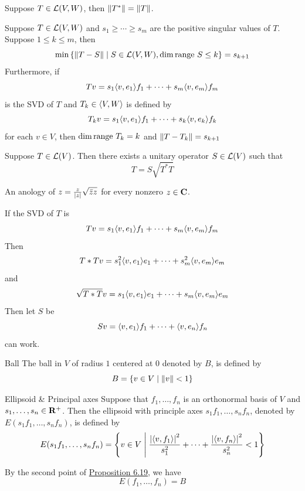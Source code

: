 \documentclass[12pt,a4paper]{article}
\begin{document}
    \begin{prop}
        Suppose $T\in\mathcal{L}(V,W)$, then $\left\lVert T^*\right\rVert=\left\lVert T\right\rVert$.
    \end{prop}
    \hfill

    \begin{prop}
        Suppose $T\in\mathcal{L}(V,W)$ and $s_1\geq\cdots\geq s_m$ are the positive singular values of $T$. Suppose $1\leq k\leq m$, then
        $$
        \min\left\{\left\lVert T-S\right\rVert\mid S\in\mathcal{L}(V,W),\dim\operatorname{range\,} S\leq k\right\}=s_{k+1}
        $$
        Furthermore, if
        $$
        Tv=s_1\langle v,e_1\rangle f_1+\cdots+s_m\langle v,e_m\rangle f_m 
        $$
        is the SVD of $T$ and $T_k\in\langle V,W\rangle$ is defined by
        $$
        T_kv=s_1\langle v,e_1\rangle f_1+\cdots+s_k\langle v,e_k\rangle f_k
        $$
        for each $v\in V$, then $\dim\operatorname{range\,} T_k=k$ and $\left\lVert T-T_k\right\rVert=s_{k+1}$
    \end{prop}
    \hfill

    \begin{prop}
        Suppose $T\in\mathcal{L}(V)$. Then there exists a unitary operator $S\in\mathcal{L}(V)$ such that
        $$
        T=S\sqrt{T^*T}
        $$
    \end{prop}
    \begin{remark}
        An anology of $z=\frac{z}{\left\lvert z\right\rvert}\sqrt{\Bar{z}z}$ for every nonzero $z\in\mathbf{C}$.
    \end{remark}
    \begin{remark}
        If the SVD of $T$ is
        $$
        Tv=s_1\langle v,e_1\rangle f_1+\cdots+s_m\langle v,e_m\rangle f_m
        $$
        Then
        $$
        T*Tv=s_1^2\langle v,e_1\rangle e_1+\cdots+s_m^2\langle v,e_m\rangle e_m
        $$
        and
        $$
        \sqrt{T*T}v=s_1\langle v,e_1\rangle e_1+\cdots+s_m\langle v,e_m\rangle e_m
        $$
        Then let $S$ be
        $$
        Sv=\langle v,e_1\rangle f_1+\cdots+\langle v,e_n\rangle f_n
        $$
        can work.
    \end{remark}
    \hfill

    \begin{defi}{Ball}
        The ball in $V$ of radius $1$ centered at $0$ denoted by $B$, is defined by
        $$
        B=\left\{v\in V\mid \left\lVert v\right\rVert<1\right\}
        $$
    \end{defi}
    \begin{defi}{Ellipsoid \& Principal axes}
        Suppose that $f_1,\dots,f_n$ is an orthonormal basis of $V$ and $s_1,\dots,s_n\in\mathbf{R}^+$. Then the ellipsoid with principle axes $s_1f_1,\dots,s_nf_n$, denoted by $E(s_1f_1,\dots,s_nf_n)$, is defined by
        $$
        E(s_1f_1,\dots,s_nf_n)=\left\{v\in V\;\middle|\;\frac{\left\lvert \langle v,f_1\rangle\right\rvert^2}{s_1^2}+\cdots+\frac{\left\lvert \langle v,f_n\rangle\right\rvert^2}{s_n^2}<1\right\}
        $$
    \end{defi}
    \begin{remark}
        By the second point of \hyperref[6.19]{Proposition 6.19}, we have
        $$
        E(f_1,\dots,f_n)=B
        $$
    \end{remark}
    \hfill
\end{document}
